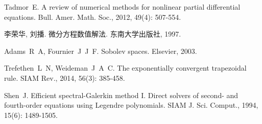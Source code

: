 

\begin{thebibliography}{99}
 Tadmor~E. A review of numerical methods for nonlinear partial differential equations\allowbreak[J]. Bull. Amer. Math. Soc., 2012, 49(4): 507-554.

 李荣华, 刘播. 微分方程数值解法\allowbreak[M]. 东南大学出版社, 1997.

 Adams~R~A, Fournier~J~J~F. Sobolev spaces\allowbreak[M]. Elsevier, 2003.

Trefethen~L~N, Weideman~J~A~C. The exponentially convergent trapezoidal rule\allowbreak[J]. SIAM Rev., 2014, 56(3): 385-458.

 Shen~J. Efficient spectral-Galerkin method I. Direct solvers of second- and fourth-order equations using Legendre polynomials\allowbreak[J]. SIAM J. Sci. Comput., 1994, 15(6): 1489-1505.

\end{thebibliography}

